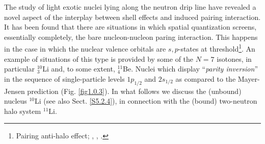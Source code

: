 



The study of light exotic nuclei lying along the neutron drip line have revealed a novel aspect of the interplay between shell effects and induced pairing interaction. It has been found  that there are situations in which spatial quantization screens, essentially completely, the bare nucleon-nucleon paring interaction. This happens in the case in which the nuclear valence orbitals are $s,p$-states at threshold\footnote{Pairing anti-halo effect; \cite{Bennaceur:00} 
, \cite{Hamamoto:03}, \cite{Hamamoto:04}.}. An example of situations of this type is provided by some of the $N=7$ isotones, in particular $^{10}_3$Li and, to some extent, $^{11}_4$Be. Nuclei which display ``\textit{parity inversion}'' in the sequence of single-particle levels $1p_{1/2}$ and $2s_{1/2}$ as compared to the Mayer-Jensen prediction (Fig. \ref{fig1.0.3}).
 In what follows we discuss the (unbound) nucleus $^{10}$Li (see also Sect. \ref{S5.2.4}), in connection with the (bound) two-neutron halo system $^{11}$Li.
 
